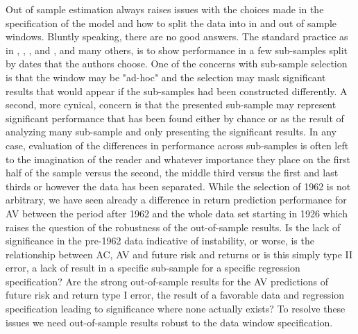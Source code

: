 Out of sample estimation always raises issues with the choices made in the specification of the model and how to split the data into in and out of sample windows. 
Bluntly speaking, there are no good answers. The standard practice as in \citet{Rapach2013}, \citet{Rapach2010}, \citet{Rapach2016}, and \cite{Huang2015}, and many others, is to show performance in a few sub-samples split by dates that the authors choose. One of the concerns with sub-sample selection is that the window may be "ad-hoc" and the selection may mask significant results that would appear if the sub-samples had been constructed differently. A second, more cynical, concern is that the presented sub-sample may represent significant performance that has been found either by chance or as the result of analyzing many sub-sample and only presenting the significant results. In any case, evaluation of the differences in performance across sub-samples is often left to the imagination of the reader and whatever importance they place on the first half of the sample versus the second, the middle third versus the first and last thirds or however the data has been separated. While the selection of 1962 is not arbitrary, we have seen already a difference in return prediction performance for AV between the period after 1962 and the whole data set starting in 1926 which raises the question of the robustness of the out-of-sample results. Is the lack of significance in the pre-1962 data indicative of instability, or worse, is the relationship between AC, AV and future risk and returns or is this simply type II error, a lack of result in a specific sub-sample for a specific regression specification? Are the strong out-of-sample results for the AV predictions of future risk and return type I error, the result of a favorable data and regression specification leading to significance where none actually exists? To resolve these issues we need out-of-sample results robust to the data window specification. 

